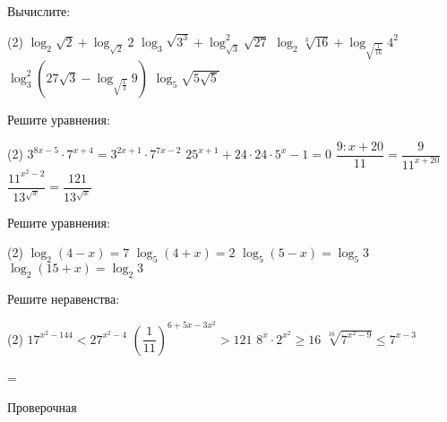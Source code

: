 \begin{class}[number=7]
	\begin{listofex}
		\item Вычислите:
		\begin{tasks}(2)
			\task \( \log_2 \sqrt{2} + \log_{\sqrt{2}}2 \)
			\task \( \log_3 \sqrt{3^3} + \log^2_{\sqrt{3}}\sqrt{27} \)
			\task \( \log_2 \sqrt[3]{16} + \log_{\sqrt{\frac{1}{16}}}4^{2} \)
			\task \( \log^2_3 (27\sqrt{3} - \log_{\sqrt{\frac{1}{3}}}9) \)
			\task \( \log_5 \sqrt{5\sqrt{5}} \)
		\end{tasks}
		\item Решите уравнения: %
		\begin{tasks}(2)
			\task \( 3^{8x-5} \cdot 7^{x+4}=3^{2x+1} \cdot 7^{7x-2} \)
			\task \( 25^{x+1}+24\cdot 24 \cdot 5^x -1=0 \)
			\task \( \dfrac{ 9:{x+20} }{ 11}=\dfrac{ 9 }{ 11^{x+20} } \)
			\task \( \dfrac{ 11^{x^2-2} }{ 13^{\sqrt{x}} }=\dfrac{ 121 }{ 13^{\sqrt{x}} } \)
		\end{tasks}
		\item Решите уравнения: %
		\begin{tasks}(2)
			\task \( \log_2 (4-x)=7 \)
			\task \( \log_5(4+x)=2 \)
			\task \( \log_5(5-x)=\log_5 3 \)
			\task \( \log_2(15+x)=\log_2 3 \)
		\end{tasks}
		\item Решите неравенства: %
		\begin{tasks}(2)
			\task \( 17^{x^2-144}<27^{x^2-4} \)
			\task \( \left( \dfrac{ 1 }{ 11 } \right)^{6+5x-3x^2} >121 \)
			\task \( 8^x \cdot 2^{x^2} \ge 16 \)
			\task \( \sqrt[16]{7^{x^2-9}}\le 7^{x-3} \)
		\end{tasks}
		
		
	\end{listofex}
\end{class}

=%
\begin{exam}
	\begin{listofex}
		\item Проверочная
	\end{listofex}
\end{exam}
